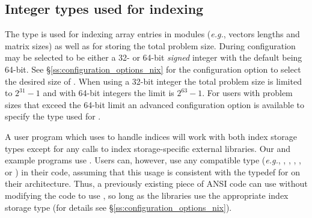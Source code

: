 \subsection{Integer types used for indexing}

The type  is used for indexing array entries in {\sundials}
modules (\textit{e.g.}, vectors lengths and matrix sizes) as well as for storing
the total problem size. During configuration  may be selected
to be either a 32- or 64-bit \emph{signed} integer with the default being
64-bit. See \S\ref{ss:configuration_options_nix} for the configuration option
to select the desired size of . When using a 32-bit integer the
total problem size is limited to $2^{31}-1$ and with 64-bit integers the limit
is $2^{63}-1$. For users with problem sizes that exceed the 64-bit limit an
advanced configuration option is available to specify the type used for
.

A user program which uses  to handle indices will work with
both index storage types except for any calls to index storage-specific
external libraries. Our  and  example programs
use . Users can, however, use any compatible type
(\textit{e.g.}, , , , , or
) in their code, assuming that this usage is consistent with
the typedef for  on their architecture. Thus, a previously
existing piece of ANSI {\CC} code can use {\sundials} without modifying the code
to use , so long as the {\sundials} libraries use the
appropriate index storage type (for details see
\S\ref{ss:configuration_options_nix}).
